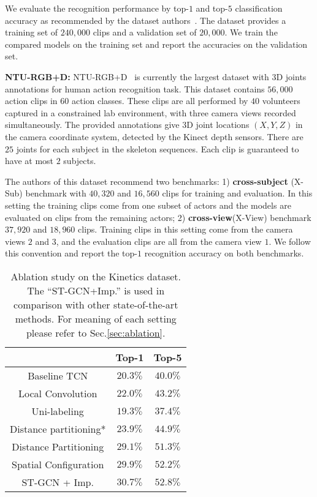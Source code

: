 \documentclass[letterpaper]{article} \usepackage{aaai18}  \usepackage{times}  \usepackage{helvet}  \usepackage{courier}  \usepackage{url}  \usepackage{graphicx}
\begin{document}
We evaluate the recognition performance by  top-$1 $ and  top-$5 $ classification accuracy as recommended by the dataset authors~\cite{Kay2017Kinetics}. 
The dataset provides a training set of $ 240,000 $ clips and a validation set of $ 20,000 $.
We train the compared models on the training set and report the accuracies on the validation set.


\textbf{NTU-RGB+D:}
NTU-RGB+D~\cite{Shahroudy2016CVPR} is currently the largest dataset with 3D joints annotations for human action recognition task.
This dataset contains $ 56,000 $ action clips in $60$ action classes.
These clips are all performed by $ 40 $ volunteers captured in a constrained lab environment, with three camera views recorded simultaneously.
The provided annotations give 3D joint locations $ (X, Y, Z) $ in the camera coordinate system, detected by the Kinect depth sensors. 
There are $ 25 $ joints for each subject in the skeleton sequences.
Each clip is guaranteed to have at most $ 2 $ subjects.

The authors of this dataset recommend two benchmarks: 
1) \textbf{cross-subject} (X-Sub) benchmark with $ 40,320 $ and $ 16,560 $ clips for training and evaluation. In this setting the training clips come from one subset of actors and the models are evaluated on clips from the remaining actors; 
2) \textbf{cross-view}(X-View) benchmark $ 37,920 $ and $ 18,960 $ clips. Training clips in this setting come from the camera views $ 2 $ and $ 3 $, and the evaluation clips are all from the camera view $ 1 $.
We follow this convention and report the top-$1$ recognition accuracy on both benchmarks.



\begin{table}
	\centering
	\begin{tabular}{c|c|c}
		\hline
		& Top-1 & Top-5 \\ \hline
		Baseline TCN			& 	$20.3\%$ & $40.0\%$\\\hline
		Local Convolution	& 	$22.0\%$ &$43.2\%$ \\\hline
		Uni-labeling	& $19.3\%$	& $37.4\%$\\
		Distance partitioning*	& $23.9\%$	&$44.9\%$  \\
		Distance Partitioning	& $29.1\%$& $51.3\%$ \\
		Spatial Configuration	& $29.9\%$& $52.2\%$ \\\hline
		ST-GCN + Imp.					& $\mathbf{30.7\%}$& $\mathbf{52.8\%}$ \\\hline
	\end{tabular}
	\caption{Ablation study on the Kinetics dataset. The ``ST-GCN+Imp.'' is used in comparison with other state-of-the-art methods.
		For meaning of each setting please refer to Sec.\ref{sec:ablation}. }\label{tab:ablation}
\end{table}
\end{document}
